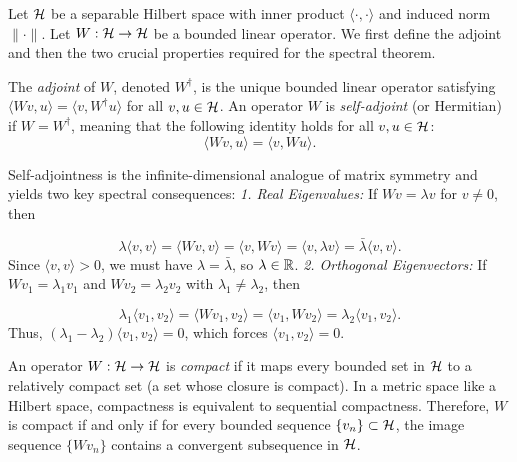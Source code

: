 Let $\mathcal{H}$ be a separable Hilbert space with inner product $\langle \cdot, \cdot \rangle$ and induced norm $\|\cdot\|$. Let $W: \mathcal{H} \to \mathcal{H}$ be a bounded linear operator. We first define the adjoint and then the two crucial properties required for the spectral theorem.

\begin{definition}
The \textit{adjoint} of $W$, denoted $W^\dagger$, is the unique bounded linear operator satisfying $\langle Wv, u \rangle = \langle v, W^\dagger u \rangle$ for all $v, u \in \mathcal{H}$.
An operator $W$ is \textit{self-adjoint} (or Hermitian) if $W = W^\dagger$, meaning that the following identity holds for all $v, u \in \mathcal{H}$:
\begin{equation}
\langle Wv, u \rangle = \langle v, Wu \rangle.
\end{equation}

\end{definition}

\begin{remark}
Self-adjointness is the infinite-dimensional analogue of matrix symmetry and yields two key spectral consequences:
\textit{1. Real Eigenvalues:} If $Wv = \lambda v$ for $v \neq 0$, then

\[
\lambda \langle v, v \rangle = \langle Wv, v \rangle = \langle v, Wv \rangle = \langle v, \lambda v \rangle = \bar{\lambda} \langle v, v \rangle.
\]
Since $\langle v, v \rangle > 0$, we must have $\lambda = \bar{\lambda}$, so $\lambda \in \mathbb{R}$.
\textit{2. Orthogonal Eigenvectors:} If $Wv_1 = \lambda_1 v_1$ and $Wv_2 = \lambda_2 v_2$ with $\lambda_1 \neq \lambda_2$, then

\[
\lambda_1 \langle v_1, v_2 \rangle = \langle Wv_1, v_2 \rangle = \langle v_1, Wv_2 \rangle = \lambda_2 \langle v_1, v_2 \rangle.
\]
Thus, $(\lambda_1 - \lambda_2)\langle v_1, v_2 \rangle = 0$, which forces $\langle v_1, v_2 \rangle = 0$.
\end{remark}

\begin{definition}
An operator $W: \mathcal{H} \to \mathcal{H}$ is \textit{compact} if it maps every bounded set in $\mathcal{H}$ to a relatively compact set (a set whose closure is compact). In a metric space like a Hilbert space, compactness is equivalent to sequential compactness. Therefore, $W$ is compact if and only if for every bounded sequence $\{v_n\} \subset \mathcal{H}$, the image sequence $\{Wv_n\}$ contains a convergent subsequence in $\mathcal{H}$.
\end{definition}

